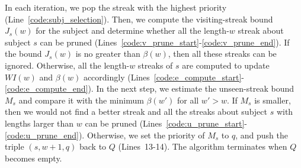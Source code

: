 In each iteration, we pop the streak with the highest priority (Line~\ref{code:subj_selection}). Then, we compute the visiting-streak bound $J_s(w)$ for the subject and determine whether all the length-$w$ streak about subject $s$ can be pruned (Lines~\ref{code:v_prune_start}-\ref{code:v_prune_end}). If the bound $J_s(w)$ is no greater than $\beta(w)$, then all these streaks can be ignored. Otherwise, all the length-$w$ streaks of $s$ are computed to update $WI(w)$ and $\beta(w)$ accordingly (Lines~\ref{code:e_compute_start}-\ref{code:e_compute_end}).
In the next step, we estimate the unseen-streak bound $M_s$ and compare it with the minimum $\beta(w')$ for all $w'> w$. If $M_s$ is smaller, then we would not find a better streak and all the streaks about subject $s$ with lengths larger than $w$ can be pruned (Lines~\ref{code:u_prune_start}-\ref{code:u_prune_end}). Otherwise,
we set the priority of $M_s$ to $q$,
 and push the triple $(s,w+1,q)$ back to $Q$ (Lines~13-14). The algorithm terminates when $Q$ becomes empty.





